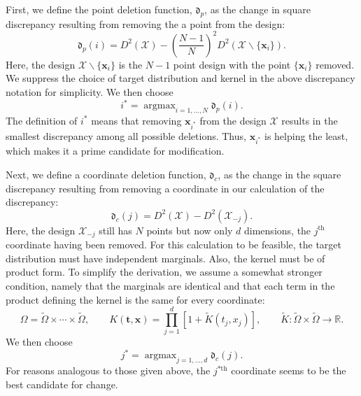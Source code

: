 \documentclass[graybox]{svmult}
\newcommand{\reals}{\mathbb{R}}
\newcommand{\vx}{\boldsymbol{x}}
\newcommand{\vt}{\boldsymbol{t}}
\DeclareMathOperator*{\argmax}{argmax}
\newcommand{\Xdes}{\mathcal{X}}
\newcommand{\frakd}{\mathfrak{d}}
\newcommand{\tK}{\widetilde{K}}
\newcommand{\tOmega}{\widetilde{\Omega}}
\begin{document}
First, we define the point deletion function, $\frakd_p$, as the change in square discrepancy resulting from removing the a point from the design:
\begin{equation}\label{eq:rowdeletion}
\frakd_p(i) = D^2(\Xdes)-\left(\frac{N-1}{N}\right)^2 D^2(\Xdes\backslash \{\vx_i\}).
\end{equation}
Here, the design $\Xdes\backslash \{\vx_i\}$ is the $N-1$ point design with the point $\{\vx_i\}$ removed. We suppress the choice of target distribution and kernel in the above discrepancy notation for simplicity. We then choose 
\begin{equation*} \label{eq:rowchoice}
    i^*=\argmax_{i=1,\ldots,N} \frakd_p(i).
\end{equation*}
The definition of $i^*$ means that removing $\vx_{i^*}$ from the design $\Xdes$ results in the smallest discrepancy among all possible deletions.  Thus, $\vx_{i^*}$ is helping the least, which makes it a prime candidate for modification.

Next, we define a coordinate deletion function, $\frakd_{c}$, as the change in the square discrepancy resulting from removing a coordinate in our calculation of the discrepancy:
\begin{equation}\label{eq:coorddeletion}
\frakd_c(j) = D^2(\Xdes)-D^2(\Xdes_{-j}).
\end{equation}
Here, the design $\Xdes_{-j}$ still has $N$ points but now only $d$ dimensions, the $j^{\text{th}}$ coordinate having been removed.  For this calculation to be feasible, the target distribution must have independent marginals.  Also, the kernel must be of product form.  To simplify the derivation, we assume a somewhat stronger condition, namely that the marginals are identical and that each term in the product defining the kernel is the same for every coordinate:
\begin{equation}
    \label{eq:prodkernel}
    \Omega = \tOmega \times \cdots \times \tOmega, \qquad K(\vt,\vx) = \prod_{j=1}^d [1+ \tK(t_j,x_j)], \qquad \tK:\tOmega \times \tOmega \to \reals.
\end{equation}
We then choose 
\begin{equation*} \label{eq:columnchoice}
    j^*=\argmax_{j=1, \ldots, d} \frakd_c(j).
\end{equation*}
For reasons analogous to those given above, the $j^{*\text{th}}$ coordinate seems to be the best candidate for change.
\end{document}

